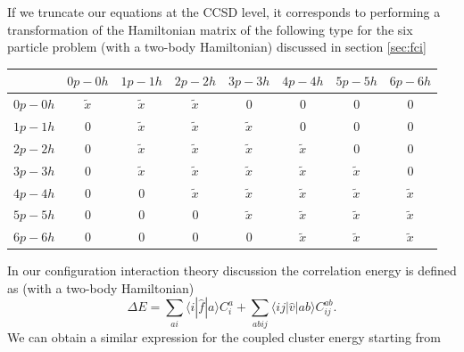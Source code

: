   If we truncate our equations at the CCSD level, it corresponds to
  performing a transformation of the Hamiltonian matrix of the
  following type for the six particle problem (with a two-body
  Hamiltonian) discussed in section \ref{sec:fci}
  \begin{table}
  \begin{center}
  \begin{tabular}{cccccccc}
  \hline \multicolumn{1}{c}{ } & \multicolumn{1}{c}{ $0p-0h$ } &
  \multicolumn{1}{c}{ $1p-1h$ } & \multicolumn{1}{c}{ $2p-2h$ } &
  \multicolumn{1}{c}{ $3p-3h$ } & \multicolumn{1}{c}{ $4p-4h$ } &
  \multicolumn{1}{c}{ $5p-5h$ } & \multicolumn{1}{c}{ $6p-6h$ }
  \\ \hline $0p-0h$ & $\tilde{x}$ & $\tilde{x}$ & $\tilde{x}$ & 0 & 0
  & 0 & 0 \\ $1p-1h$ & 0 & $\tilde{x}$ & $\tilde{x}$ & $\tilde{x}$ & 0
  & 0 & 0 \\ $2p-2h$ & 0 & $\tilde{x}$ & $\tilde{x}$ & $\tilde{x}$ &
  $\tilde{x}$ & 0 & 0 \\ $3p-3h$ & 0 & $\tilde{x}$ & $\tilde{x}$ &
  $\tilde{x}$ & $\tilde{x}$ & $\tilde{x}$ & 0 \\ $4p-4h$ & 0 & 0 &
  $\tilde{x}$ & $\tilde{x}$ & $\tilde{x}$ & $\tilde{x}$ & $\tilde{x}$
  \\ $5p-5h$ & 0 & 0 & 0 & $\tilde{x}$ & $\tilde{x}$ & $\tilde{x}$ &
  $\tilde{x}$ \\ $6p-6h$ & 0 & 0 & 0 & 0 & $\tilde{x}$ & $\tilde{x}$ &
  $\tilde{x}$ \\ \hline
  \end{tabular}
  \end{center}
  \end{table}

  In our configuration interaction theory discussion the correlation energy is defined as (with a
  two-body Hamiltonian) 
  \[
  \Delta E=\sum_{ai}\langle i| \hat{f}|a \rangle C_{i}^{a}+
  \sum_{abij}\langle ij | \hat{v}| ab \rangle C_{ij}^{ab}.
  \]
We can obtain a similar expression for the coupled cluster energy starting from 

